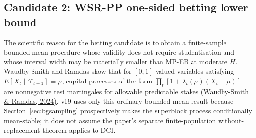 \documentclass[11pt,a4paper]{article}
\begin{document}
\subsection{Candidate 2: WSR-PP one-sided betting lower bound}\label{sec:wsr}
The scientific reason for the betting candidate is to obtain a finite-sample bounded-mean procedure whose validity does not require studentisation and whose interval width may be materially smaller than MP-EB at moderate $H$. Waudby-Smith and Ramdas show that for $[0,1]$-valued variables satisfying $E[X_t\mid\mathcal F_{t-1}]=\mu$, capital processes of the form $\prod_t[1+\lambda_t(\mu)(X_t-\mu)]$ are nonnegative test martingales for allowable predictable stakes \href{https://doi.org/10.1093/jrsssb/qkad009}{(Waudby-Smith \& Ramdas, 2024)}. v19 uses only this ordinary bounded-mean result because Section~\ref{sec:bgsampling} prospectively makes the superblock process conditionally mean-stable; it does not assume the paper's separate finite-population without-replacement theorem applies to DCI.
\end{document}
